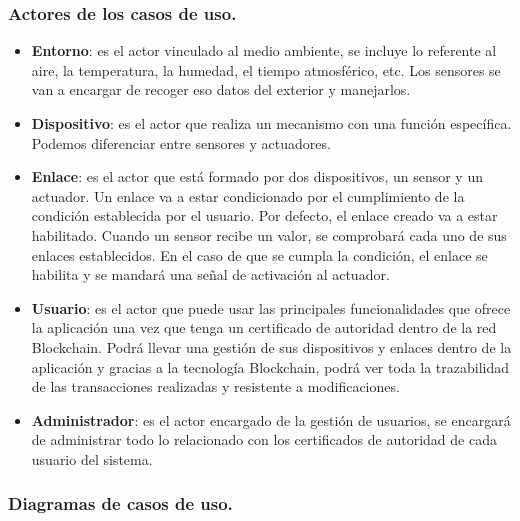 \subsubsection{Actores de los casos de uso.}

\begin{itemize}
    \item \textbf{Entorno}: es el actor vinculado al medio ambiente, se incluye lo referente al aire, la temperatura, la humedad,
    el tiempo atmosférico, etc. Los sensores se van a encargar de recoger eso datos del exterior y manejarlos.
    \item \textbf{Dispositivo}: es el actor que realiza un mecanismo con una función específica. Podemos diferenciar entre sensores
    y actuadores.
    \item \textbf{Enlace}: es el actor que está formado por dos dispositivos, un sensor y un actuador. Un enlace va a estar 
    condicionado por el cumplimiento de la condición establecida por el usuario. Por defecto, el enlace creado va a estar habilitado. 
    Cuando un sensor recibe un valor, se comprobará cada uno de sus enlaces establecidos. En el caso de que se cumpla la condición, 
    el enlace se habilita y se mandará una señal de activación al actuador.
    \item \textbf{Usuario}: es el actor que puede usar las principales funcionalidades que ofrece la aplicación una vez que 
    tenga un certificado de autoridad dentro de la red Blockchain. Podrá llevar una gestión de sus dispositivos y enlaces dentro
    de la aplicación y gracias a la tecnología Blockchain, podrá ver toda la trazabilidad de las transacciones realizadas y 
    resistente a modificaciones.
    \item \textbf{Administrador}: es el actor encargado de la gestión de usuarios, se encargará de administrar todo lo relacionado
    con los certificados de autoridad de cada usuario del sistema.
\end{itemize}

\subsubsection{Diagramas de casos de uso.}

